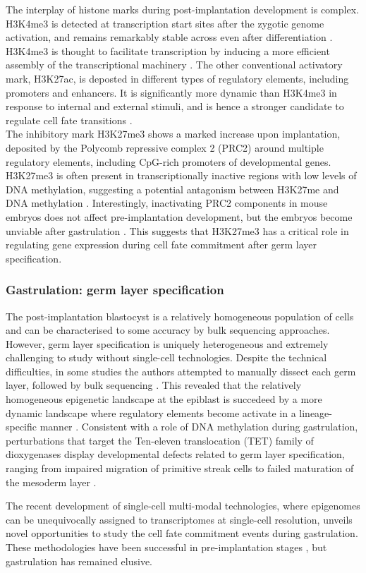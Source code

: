 The interplay of histone marks during post-implantation development is complex. H3K4me3 is detected at transcription start sites after the zygotic genome activation, and remains remarkably stable across even after differentiation \cite{Heintzman2009}. H3K4me3 is thought to facilitate transcription by inducing a more efficient assembly of the transcriptional machinery \cite{Atlasi2017,Vastenhouw2010}. The other conventional activatory mark, H3K27ac, is deposted in different types of regulatory elements, including promoters and enhancers. It is significantly more dynamic than H3K4me3 in response to internal and external stimuli, and is hence a stronger candidate to regulate cell fate transitions \cite{Atlasi2017,Rada-Iglesias2011}.\\
The inhibitory mark H3K27me3 shows a marked increase upon implantation, deposited by the Polycomb repressive complex 2 (PRC2) around multiple regulatory elements, including CpG-rich promoters of developmental genes. H3K27me3 is often present in transcriptionally inactive regions with low levels of DNA methylation, suggesting a potential antagonism between H3K27me and DNA methylation \cite{Brinkman2012,Atlasi2017}. Interestingly, inactivating PRC2 components in mouse embryos does not affect pre-implantation development, but the embryos become unviable after gastrulation \cite{Shan2017}. This suggests that H3K27me3 has a critical role in regulating gene expression during cell fate commitment after germ layer specification.

\subsubsection{Gastrulation: germ layer specification}

The post-implantation blastocyst is a relatively homogeneous population of cells and can be characterised to some accuracy by bulk sequencing approaches. However, germ layer specification is uniquely heterogeneous and extremely challenging to study without single-cell technologies. Despite the technical difficulties, in some studies the authors attempted to manually dissect each germ layer, followed by bulk sequencing \cite{Zhang2018}. This revealed that the relatively homogeneous epigenetic landscape at the epiblast is succedeed by a more dynamic landscape where regulatory elements become activate in a lineage-specific manner \cite{Zhang2018,Lee2015}. Consistent with a role of DNA methylation during gastrulation, perturbations that target the Ten-eleven translocation (TET) family of dioxygenases display developmental defects related to germ layer specification, ranging from impaired migration of primitive streak cells to failed maturation of the mesoderm layer \cite{Dai2016}.

The recent development of single-cell multi-modal technologies, where epigenomes can be unequivocally assigned to transcriptomes at single-cell resolution, unveils novel opportunities to study the cell fate commitment events during gastrulation. These methodologies have been successful in pre-implantation stages \cite{Guo2017,Wang2019,Liu2019}, but gastrulation has remained elusive.

